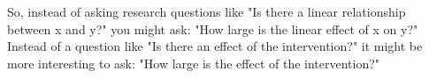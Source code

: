 \documentclass[]{book}\usepackage[]{graphicx}\usepackage[]{color}
\begin{document}
%
%
%
%





So, instead of asking research questions like "Is there a linear relationship between x and y?" you might ask: "How large is the linear effect of x on y?" Instead of a question like "Is there an effect of the intervention?" it might be more interesting to ask: "How large is the effect of the intervention?"
\end{document}
